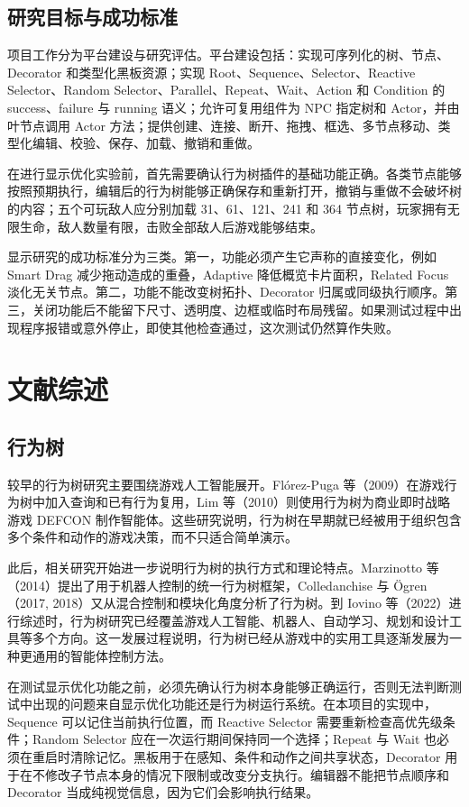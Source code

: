 \documentclass[11pt,a4paper,oneside,extrafontsizes]{memoir}
\begin{document}
\section{研究目标与成功标准}

项目工作分为平台建设与研究评估。平台建设包括：实现可序列化的树、节点、Decorator 和类型化黑板资源；实现 Root、Sequence、Selector、Reactive Selector、Random Selector、Parallel、Repeat、Wait、Action 和 Condition 的 success、failure 与 running 语义；允许可复用组件为 NPC 指定树和 Actor，并由叶节点调用 Actor 方法；提供创建、连接、断开、拖拽、框选、多节点移动、类型化编辑、校验、保存、加载、撤销和重做。

在进行显示优化实验前，首先需要确认行为树插件的基础功能正确。各类节点能够按照预期执行，编辑后的行为树能够正确保存和重新打开，撤销与重做不会破坏树的内容；五个可玩敌人应分别加载 31、61、121、241 和 364 节点树，玩家拥有无限生命，敌人数量有限，击败全部敌人后游戏能够结束。

显示研究的成功标准分为三类。第一，功能必须产生它声称的直接变化，例如 Smart Drag 减少拖动造成的重叠，Adaptive 降低概览卡片面积，Related Focus 淡化无关节点。第二，功能不能改变树拓扑、Decorator 归属或同级执行顺序。第三，关闭功能后不能留下尺寸、透明度、边框或临时布局残留。如果测试过程中出现程序报错或意外停止，即使其他检查通过，这次测试仍然算作失败。

\chapter{文献综述}

\section{行为树}

较早的行为树研究主要围绕游戏人工智能展开。Flórez-Puga 等（2009）在游戏行为树中加入查询和已有行为复用，Lim 等（2010）则使用行为树为商业即时战略游戏 DEFCON 制作智能体。这些研究说明，行为树在早期就已经被用于组织包含多个条件和动作的游戏决策，而不只适合简单演示。

此后，相关研究开始进一步说明行为树的执行方式和理论特点。Marzinotto 等（2014）提出了用于机器人控制的统一行为树框架，Colledanchise 与 Ögren（2017, 2018）又从混合控制和模块化角度分析了行为树。到 Iovino 等（2022）进行综述时，行为树研究已经覆盖游戏人工智能、机器人、自动学习、规划和设计工具等多个方向。这一发展过程说明，行为树已经从游戏中的实用工具逐渐发展为一种更通用的智能体控制方法。

在测试显示优化功能之前，必须先确认行为树本身能够正确运行，否则无法判断测试中出现的问题来自显示优化功能还是行为树运行系统。在本项目的实现中，Sequence 可以记住当前执行位置，而 Reactive Selector 需要重新检查高优先级条件；Random Selector 应在一次运行期间保持同一个选择；Repeat 与 Wait 也必须在重启时清除记忆。黑板用于在感知、条件和动作之间共享状态，Decorator 用于在不修改子节点本身的情况下限制或改变分支执行。编辑器不能把节点顺序和 Decorator 当成纯视觉信息，因为它们会影响执行结果。
\end{document}
